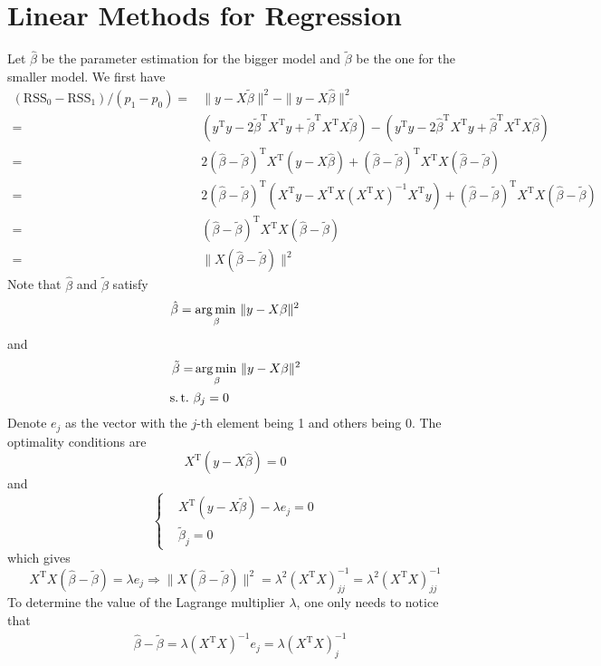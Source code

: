 \section{Linear Methods for Regression}

\begin{sol}
Let $\hat{\beta}$ be the parameter estimation for the bigger model and $\tilde{\beta}$ be the one for the smaller model. We first have
\begin{align*}
(\mathrm{RSS}_0-\mathrm{RSS}_1)/(p_1-p_0) = & \|y-X\tilde{\beta}\|^2 - \|y-X\hat{\beta}\|^2 \\
=& (y^\mathrm{T}y-2\tilde{\beta}^\mathrm{T}X^\mathrm{T}y+\tilde{\beta}^\mathrm{T}X^\mathrm{T}X\tilde{\beta}) - (y^\mathrm{T}y-2\hat{\beta}^\mathrm{T}X^\mathrm{T}y+\hat{\beta}^\mathrm{T}X^\mathrm{T}X\hat{\beta}) \\
=& 2(\hat{\beta}-\tilde{\beta})^\mathrm{T}X^\mathrm{T}(y-X\hat{\beta}) + (\hat{\beta}-\tilde{\beta})^\mathrm{T}X^\mathrm{T}X (\hat{\beta}-\tilde{\beta}) \\
=& 2(\hat{\beta}-\tilde{\beta})^\mathrm{T}(X^\mathrm{T}y-X^\mathrm{T}X(X^\mathrm{T}X)^{-1}X^\mathrm{T}y) + (\hat{\beta}-\tilde{\beta})^\mathrm{T}X^\mathrm{T}X (\hat{\beta}-\tilde{\beta}) \\
=& (\hat{\beta}-\tilde{\beta})^\mathrm{T}X^\mathrm{T}X (\hat{\beta}-\tilde{\beta})\\
=& \|X (\hat{\beta}-\tilde{\beta})\|^2
\end{align*}
Note that $\hat{\beta}$ and $\tilde{\beta}$ satisfy
\[
\hat{\beta}=\operatorname*{arg\,min\,}_\beta\|y-X\beta\|^2
\]
and
\begin{align*}
\tilde{\beta}=&\argmin_\beta\|y-X\beta\|^2\\
\st &\beta_j=0
\end{align*}
Denote $e_j$ as the vector with the $j$-th element being 1 and others being 0. The optimality conditions are
\[
X^\mathrm{T}(y-X\hat{\beta})=0
\]
and
\[
\begin{cases}
& X^\mathrm{T}(y-X\tilde{\beta})-\lambda e_j=0\\
& \tilde{\beta}_j=0
\end{cases}
\]
which gives
\[
X^\mathrm{T}X (\hat{\beta}-\tilde{\beta}) = \lambda e_j \Longrightarrow \|X (\hat{\beta}-\tilde{\beta})\|^2 = \lambda^2 (X^\mathrm{T}X)^{-1}_{jj} = \lambda^2 (X^\mathrm{T}X)^{-1}_{jj}
\]
To determine the value of the Lagrange multiplier $\lambda$, one only needs to notice that
\begin{align*}
&\hat{\beta}-\tilde{\beta} = \lambda (X^\mathrm{T}X)^{-1} e_j = \lambda (X^\mathrm{T}X)^{-1}_j \\

\end{align*}
\end{sol}
